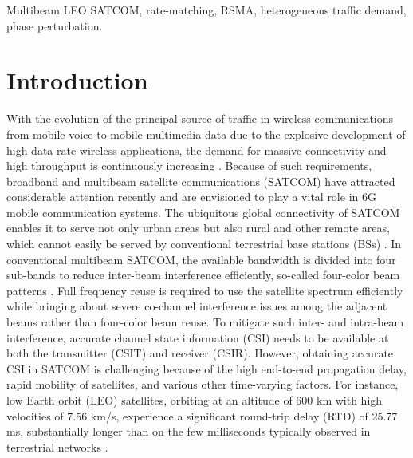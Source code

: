 \documentclass[draftclsnofoot, onecolumn, comsoc, 12pt]{IEEEtran}
\begin{document}
\begin{IEEEkeywords}
Multibeam LEO SATCOM, rate-matching, RSMA, heterogeneous traffic demand, phase perturbation.
\end{IEEEkeywords}

\IEEEpeerreviewmaketitle


\section{Introduction}
With the evolution of the principal source of traffic in wireless communications from mobile voice to mobile multimedia data due to the explosive development of high data rate wireless applications, the demand for massive connectivity and high throughput is continuously increasing \cite{zhong2018traffic}. 
Because of such requirements, broadband and multibeam satellite communications (SATCOM) have attracted considerable attention recently and are envisioned to play a vital role in 6G mobile communication systems.
The ubiquitous global connectivity of SATCOM enables it to serve not only urban areas but also rural and other remote areas, which cannot easily be served by conventional terrestrial base stations (BSs) \cite{perez2019signal}. 
In conventional multibeam SATCOM, the available bandwidth is divided into four sub-bands to reduce inter-beam interference efficiently, so-called four-color beam patterns \cite{perez2019signal}. 
Full frequency reuse is required to use the satellite spectrum efficiently while bringing about severe co-channel interference issues among the adjacent beams rather than four-color beam reuse.
To mitigate such inter- and intra-beam interference, accurate channel state information (CSI) needs to be available at both the transmitter (CSIT) and receiver (CSIR). 
% 
However, obtaining accurate CSI in SATCOM is challenging because of the high end-to-end propagation delay, rapid mobility of satellites, and various other time-varying factors. 
{ For instance, low Earth orbit (LEO) satellites, orbiting at an altitude of 600 km with high velocities of 7.56 km/s, experience a significant round-trip delay (RTD) of 25.77 ms, substantially longer than on the few milliseconds typically observed in terrestrial networks \cite{10559954}.}
\end{document}
